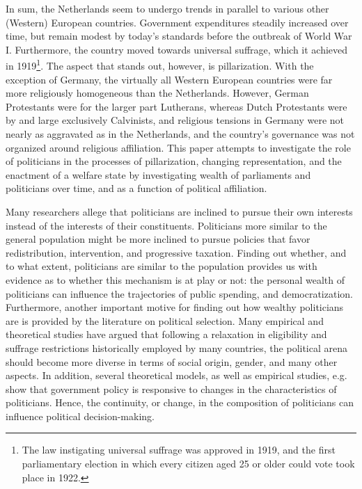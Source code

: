 In sum, the Netherlands seem to undergo trends in parallel to various other (Western) European countries. Government expenditures steadily increased over time, but remain modest by today's standards before the outbreak of World War I. Furthermore, the country moved towards universal suffrage, which it achieved in 1919\footnote{The law instigating universal suffrage was approved in 1919, and the first parliamentary election in which every citizen aged 25 or older could vote took place in 1922.}. The aspect that stands out, however, is pillarization. With the exception of Germany, the virtually all Western European countries were far more religiously homogeneous than the Netherlands. However, German Protestants were for the larger part Lutherans, whereas Dutch Protestants were by and large exclusively Calvinists, and religious tensions in Germany were not nearly as aggravated as in the Netherlands, and the country's governance was not organized around religious affiliation. This paper attempts to investigate the role of politicians in the processes of pillarization, changing representation, and the enactment of a welfare state by investigating wealth of parliaments and politicians over time, and as a function of political affiliation.

Many researchers allege that politicians are inclined to pursue their own interests instead of the interests of their constituents. \autocite{lizzeri2004did, duggan2017political, corvalan2020political} Politicians more similar to the general population might be more inclined to pursue policies that favor redistribution, intervention, and progressive taxation. Finding out whether, and to what extent, politicians are similar to the population provides us with evidence as to whether this mechanism is at play or not: the personal wealth of politicians can influence the trajectories of public spending, and democratization. Furthermore, another important motive for finding out how wealthy politicians are is provided by the literature on political selection. Many empirical and theoretical studies have argued that following a relaxation in eligibility and suffrage restrictions historically employed by many countries, the political arena should  become more diverse in terms of social origin, gender, and many other aspects.\autocite{besley1997economic, besley2005political, bernini2018race} In addition, several theoretical models, as well as empirical studies, e.g.  show that government policy is responsive to changes in the characteristics of politicians. \autocite{meltzer1981rational, besley2011educated, chattopadhyay2004women, hayo2014political} Hence, the continuity, or change, in the composition of politicians can influence political decision-making. 

